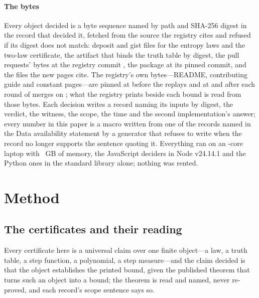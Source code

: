 \documentclass[preprint,11pt,authoryear,a4paper]{elsarticle}
\begin{document}
\paragraph{The bytes} Every object decided is a byte sequence named by path and SHA-256 digest in the record that decided it, fetched from the source the registry cites and refused if its digest does not match: deposit and gist files for the entropy laws and the two-law certificate, the artifact that binds the truth table by digest, the pull requests' bytes at the registry commit \OcQueueRegistryCommit{}, the package at its pinned commit, and the files the new pages cite. The registry's own bytes---README, contributing guide and constant pages---are pinned at \MtRgBeforeCommit{} before the replays and at \MtRgRegistryCommit{} and \MtRgSecondRegistryCommit{} after each round of merges on \MtRgMergeDate{}; what the registry prints beside each bound is read from those bytes. Each decision writes a record naming its inputs by digest, the verdict, the witness, the scope, the time and the second implementation's answer; every number in this paper is a macro written from one of the records named in the Data availability statement by a generator that refuses to write when the record no longer supports the sentence quoting it. Everything ran on an \MtDeskCpus-core laptop with \MtDeskMemory~GB of memory, the JavaScript deciders in Node v24.14.1 and the Python ones in the standard library alone; nothing was rented.

\section{Method}\label{sec:method}

\subsection{The certificates and their reading}\label{sec:reading}

Every certificate here is a universal claim over one finite object---a law, a truth table, a step function, a polynomial, a step measure---and the claim decided is that the object establishes the printed bound, given the published theorem that turns such an object into a bound; the theorem is read and named, never re-proved, and each record's scope sentence says so.
\end{document}
